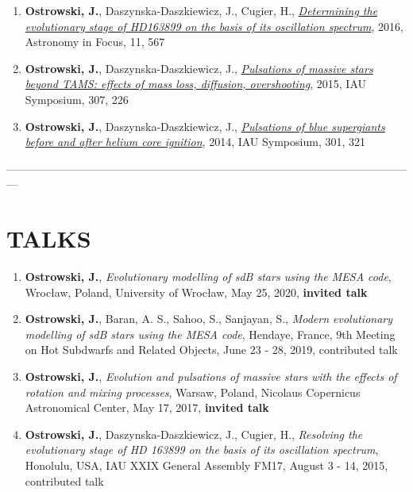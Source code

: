 \documentclass[margin, 10pt]{res} %
\begin{document}
\begin{resume}
\begin{enumerate}
    \item \textbf{Ostrowski, J.}, Daszynska-Daszkiewicz, J., Cugier, H., \href{http://adsabs.harvard.edu/abs/2016IAUFM..29B.567O}{\textit{Determining the evolutionary stage of HD163899 on the basis of its oscillation spectrum}}, 2016, Astronomy in Focus, 11, 567

    \item \textbf{Ostrowski, J.}, Daszynska-Daszkiewicz, J., \href{http://adsabs.harvard.edu/abs/2015IAUS..307..226O}{\textit{Pulsations of massive stars beyond TAMS: effects of mass loss, diffusion, overshooting}}, 2015, IAU Symposium, 307, 226

    \item \textbf{Ostrowski, J.}, Daszynska-Daszkiewicz, J., \href{http://adsabs.harvard.edu/abs/2014IAUS..301..321O}{\textit{Pulsations of blue supergiants before and after helium core ignition}}, 2014, IAU Symposium, 301, 321
\end{enumerate}

---------------------------------------------------------------------------------------------------------------

\section{TALKS}

\begin{enumerate}
    \item \textbf{Ostrowski, J.}, \textit{Evolutionary modelling of sdB stars using the MESA code}, Wroc\l{}aw, Poland, University of Wroc\l{}aw, May 25, 2020, \textbf{invited talk}

    \item \textbf{Ostrowski, J.}, Baran, A. S., Sahoo, S., Sanjayan, S., \textit{Modern evolutionary modelling of sdB stars using the MESA code}, Hendaye, France, 9th Meeting on Hot Subdwarfs and Related Objects, June 23 - 28, 2019, contributed talk

    \item \textbf{Ostrowski, J.}, \textit{Evolution and pulsations of massive stars with the effects of rotation and mixing processes}, Warsaw, Poland, Nicolaus Copernicus Astronomical Center, May 17, 2017, \textbf{invited talk}

    \item \textbf{Ostrowski, J.}, Daszynska-Daszkiewicz, J., Cugier, H., \textit{Resolving the evolutionary stage of HD 163899 on the basis of its oscillation spectrum}, Honolulu, USA, IAU XXIX General Assembly FM17, August 3 - 14, 2015, contributed talk


\end{enumerate}
\end{resume}
\end{document}
